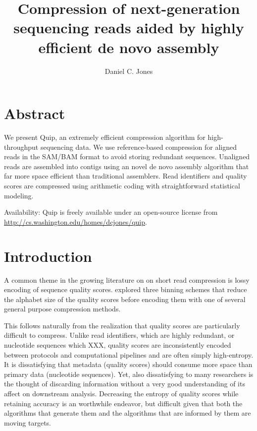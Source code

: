 \documentclass[twocolumn]{article}
\title{Compression of next-generation sequencing reads aided by highly efficient de novo assembly}
\author{Daniel C. Jones}
\begin{document}
\maketitle

\section{Abstract}

We present Quip, an extremely efficient compression algorithm for
high-throughput sequencing data.  We use reference-based compression for aligned
reads in the SAM/BAM format to avoid storing redundant sequences.  Unaligned
reads are assembled into contigs using an novel de novo assembly algorithm that
far more space efficient than traditional assemblers.  Read identifiers and
quality scores are compressed using arithmetic coding with straightforward
statistical modeling.

Availability: Quip is freely available under an open-source license from
\url{http://cs.washington.edu/homes/dcjones/quip}.


\section{Introduction}




A common theme in the growing literature on on short read compression is lossy
encoding of sequence quality scores. \citet{Wan2011} explored three binning
schemes that reduce the alphabet size of the quality scores before encoding
them with one of several general purpose compression methods.


This follows naturally from the realization that quality scores are
particularly difficult to compress. Unlike read identifiers, which are highly
redundant, or nucleotide sequences which XXX, quality scores are
inconsistently encoded between protocols and computational pipelines and are
often simply high-entropy. It is dissatisfying that metadata (quality scores)
should consume more space than primary data (nucleotide sequences). Yet, also
dissatisfying to many researchers is the thought of discarding information
without a very good understanding of its affect on downstream analysis.
Decreasing the entropy of quality scores while retaining accuracy is an
worthwhile endeavor, but difficult given that both the algorithms that
generate them and the algorithms that are informed by them are moving targets.
\end{document}
